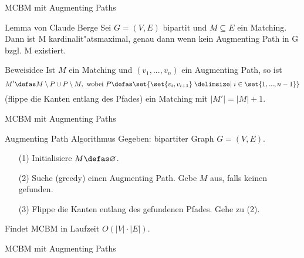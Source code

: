 \begin{frame}{MCBM mit Augmenting Paths}
\begin{block}{Lemma von Claude Berge}
Sei \(G = (V,E)\) bipartit und \(M \subseteq E\) ein Matching. \pause Dann ist M kardinalit"atsmaximal, genau dann wenn kein Augmenting Path in G bzgl. M existiert.
\end{block}\pause
\begin{block}{Beweisidee}\pause
Ist \(M\) ein Matching und \((v_1,...,v_n)\) ein Augmenting Path\pause, so ist
\[
M' \defas M \setminus P \cup P \setminus M, \text{ wobei } P \defas \set{\set{v_i, v_{i+1}} \given i \in \set{1,...,n-1}}
\]
(flippe die Kanten entlang des Pfades) ein Matching mit \(|M'| = |M| + 1\).
\end{block}
\end{frame}

\begin{frame}{MCBM mit Augmenting Paths}
\begin{block}{Augmenting Path Algorithmus}
Gegeben: bipartiter Graph \(G = (V, E)\).
\begin{itemize}
\pause\item[(1)] Initialisiere \(M \defas \varnothing\).
\pause\item[(2)] Suche (greedy) einen Augmenting Path. Gebe \(M\) aus, falls keinen gefunden.
\pause\item[(3)] Flippe die Kanten entlang des gefundenen Pfades. Gehe zu (2).
\end{itemize}\pause
Findet MCBM in Laufzeit \(O(|V|\cdot |E|)\).
\end{block}
\end{frame}

\begin{frame}{MCBM mit Augmenting Paths}

\begin{figure}
\end{figure}
\end{frame}

